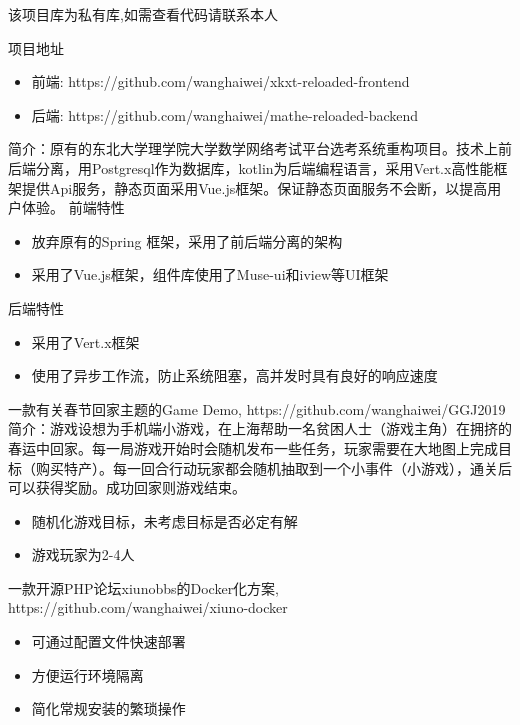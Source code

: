 \documentclass{resume}
\begin{document}
该项目库为私有库,如需查看代码请联系本人
\begin{onehalfspacing}
项目地址
\begin{itemize}
  \item 前端: https://github.com/wanghaiwei/xkxt-reloaded-frontend
  \item 后端: https://github.com/wanghaiwei/mathe-reloaded-backend
\end{itemize}
简介：原有的东北大学理学院大学数学网络考试平台选考系统重构项目。技术上前后端分离，用Postgresql作为数据库，kotlin为后端编程语言，采用Vert.x高性能框架提供Api服务，静态页面采用Vue.js框架。保证静态页面服务不会断，以提高用户体验。
\newline
前端特性
\begin{itemize}
  \item 放弃原有的Spring 框架，采用了前后端分离的架构
  \item 采用了Vue.js框架，组件库使用了Muse-ui和iview等UI框架
\end{itemize}
后端特性
\begin{itemize}
  \item 采用了Vert.x框架
  \item 使用了异步工作流，防止系统阻塞，高并发时具有良好的响应速度
\end{itemize}
\end{onehalfspacing}

\newpage

\begin{onehalfspacing}
一款有关春节回家主题的Game Demo, https://github.com/wanghaiwei/GGJ2019
\newline
简介：游戏设想为手机端小游戏，在上海帮助一名贫困人士（游戏主角）在拥挤的春运中回家。每一局游戏开始时会随机发布一些任务，玩家需要在大地图上完成目标（购买特产）。每一回合行动玩家都会随机抽取到一个小事件（小游戏），通关后可以获得奖励。成功回家则游戏结束。
\begin{itemize}
  \item 随机化游戏目标，未考虑目标是否必定有解
  \item 游戏玩家为2-4人
\end{itemize}
\end{onehalfspacing}

\begin{onehalfspacing}
一款开源PHP论坛xiunobbs的Docker化方案, https://github.com/wanghaiwei/xiuno-docker
\begin{itemize}
  \item 可通过配置文件快速部署
  \item 方便运行环境隔离
  \item 简化常规安装的繁琐操作
\end{itemize}
\end{onehalfspacing}
\end{document}
